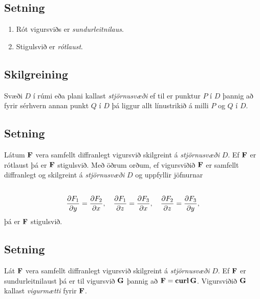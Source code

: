 \documentclass[a4paper,10pt,icelandic]{sphinxmanual}
\begin{document}
\subsection{Setning}
\label{Kafli6:setning}\begin{enumerate}
\item {} 
Rót vigursviðs er \textit{sundurleitnilaus}.

\item {} 
Stigulsvið er \textit{rótlaust}.

\end{enumerate}


\subsection{Skilgreining}
\label{Kafli6:id4}\label{Kafli6:index-1}
Svæði \(D\) í rúmi eða plani kallast \textit{stjörnusvæði} ef til er
punktur \(P\) í \(D\) þannig að fyrir sérhvern annan punkt
\(Q\) í \(D\) þá liggur allt línustrikið á milli \(P\) og
\(Q\) í \(D\).


\subsection{Setning}
\label{Kafli6:id5}
Látum \(\mbox{${\bf F}$}\) vera samfellt diffranlegt vigursvið
skilgreint á \textit{stjörnusvæði} \(D\). Ef \(\mbox{${\bf F}$}\) er
rótlaust þá er \(\mbox{${\bf F}$}\) stigulsvið. Með öðrum orðum, ef
vigursviðið \(\mbox{${\bf F}$}\) er samfellt diffranlegt og
skilgreint á \textit{stjörnusvæði} \(D\) og uppfyllir jöfnurnar
\begin{gather}
\begin{split}\displaystyle\end{split}\notag\\\begin{split}\frac{\partial F_1}{\partial y}=
\frac{\partial F_2}{\partial x},\quad
\frac{\partial F_1}{\partial z}=
\frac{\partial F_3}{\partial x},\quad
\frac{\partial F_2}{\partial z}=
\frac{\partial F_3}{\partial y},\end{split}\notag
\end{gather}
þá er \(\mbox{${\bf F}$}\) stigulsvið.


\subsection{Setning}
\label{Kafli6:id6}
Lát \(\mbox{${\bf F}$}\) vera samfellt diffranlegt vigursvið
skilgreint á \textit{stjörnusvæði} \(D\). Ef \(\mbox{${\bf F}$}\) er
sundurleitnilaust þá er til vigursvið \(\mbox{${\bf G}$}\) þannig að
\(\mbox{${\bf F}$}=\mbox{${\rm\bf curl\,}$}\mbox{${\bf G}$}\).
Vigursviðið \(\mbox{${\bf G}$}\) kallast \emph{vigurmætti} fyrir
\(\mbox{${\bf F}$}\).
\end{document}

